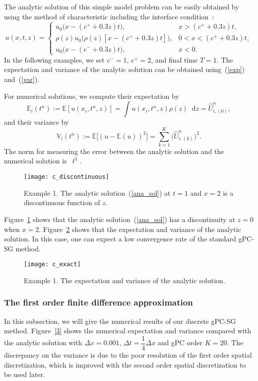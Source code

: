 \documentclass[12pt]{article}
\theoremstyle{plain}
\theoremstyle{remark}
\theoremstyle{remark}
\theoremstyle{remark}
\numberwithin{equation}{section}
\newcommand*\diff{\mathop{}\!\mathrm{d}}
\newcommand{\Dx}{\Delta x}
\newcommand{\Dt}{\Delta t}
\begin{document}
The analytic solution of this simple model problem can be easily obtained by using the method of characteristic including the interface condition~\cite{Wen:2005ueba}:
\begin{equation}\label{ana_sol}
  u(x, t, z)=   
  \begin{cases}
    u_0\big(x - (c^+ + 0.3z)t\big), \quad &x > (c^+ + 0.3z)t,\\
    \rho(z) u_0\big(\rho(z)[x - (c^+ + 0.3z)t]\big), &0 < x < (c^+ + 0.3z)t,\\
    u_0\big(x - (c^- + 0.3z)t\big),  &x < 0.
  \end{cases}
\end{equation}
In the following examples, we set $c^- = 1$, $c^+ = 2$, and final time $T = 1$. The expectation and variance of the analytic solution can be obtained using~(\ref{exp}) and~(\ref{var}).

For numerical solutions, we compute their expectation by 
\begin{equation*}
  \mathbb{E}_i(t^n):=\mathbb{E}[u(x_i,t^n,z)]=\int u(x_i,t^n,z)\rho(z)\diff z = \hat{U}^n_{i,(0)}, 
\end{equation*}
and their variance by
\begin{equation*}
  \mathbb{V}_i(t^n):=\mathbb{E}\big[(u-\mathbb{E}(u))^2\big] = \sum_{k=1}^K \big(\hat{U}^n_{i,(k)}\big)^2.
\end{equation*}
The norm for measuring the error between the analytic solution and the numerical solution is~$\ell^1$.

\begin{figure}[htbp]
  \centering
  \texttt{[image: c\_discontinuous]}
  \caption{Example 1. The analytic solution~(\ref{ana_sol}) at $t=1$ and $x=2$ is a discontinuous function of $z$.}
  \label{1}
\end{figure}
Figure~\ref{1} shows that the analytic solution~(\ref{ana_sol}) has a discontinuity at $z = 0$ when $x = 2$.  Figure~\ref{2} shows that the expectation and variance of the analytic solution. In this case, one can expect a low  convergence rate of the standard gPC-SG method.  
\begin{figure}[htbp]
  \centering
  \texttt{[image: c\_exact]}
  \caption{Example 1. The expectation and variance of the analytic solution.}
  \label{2}
\end{figure}


\subsubsection{The first order finite difference approximation}
In this subsection, we will give the numerical results of our discrete gPC-SG method.  Figure~\ref{3} shows the numerical expectation and variance compared with the analytic solution with $\Dx = 0.001$, $\Dt = \dfrac{1}{4}\Dx$ and gPC order $K=20$. The discrepancy on the variance is due to the poor resolution of the
first order spatial discretization, which is improved with the second order
spatial discretization to be used later.
\end{document}
